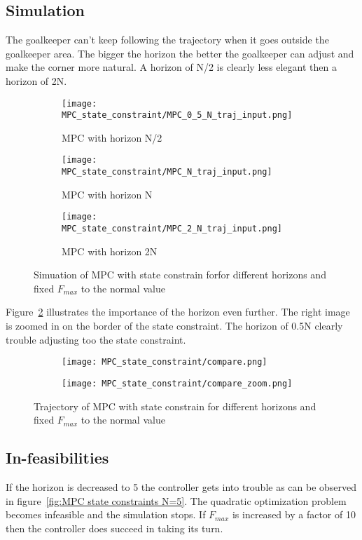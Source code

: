 \subsection{Simulation}
	The goalkeeper can't keep following the trajectory when it goes outside the goalkeeper area. The bigger the horizon the better the goalkeeper can adjust and make the corner more natural. A horizon of N/2 is clearly less elegant then a horizon of 2N. 
	\begin{figure}[H]
		\centering
		\begin{subfigure}[b]{0.45\textwidth}
			\texttt{[image: MPC\_state\_constraint/MPC\_0\_5\_N\_traj\_input.png]}
			\caption{MPC with horizon N/2}
		\end{subfigure}
		\begin{subfigure}[b]{0.45\textwidth}
			\texttt{[image: MPC\_state\_constraint/MPC\_N\_traj\_input.png]}
			\caption{MPC with horizon N}
		\end{subfigure}
		\begin{subfigure}[b]{0.45\textwidth}
			\texttt{[image: MPC\_state\_constraint/MPC\_2\_N\_traj\_input.png]}
			\caption{MPC with horizon 2N}
		\end{subfigure}
		\caption{Simuation of MPC with state constrain forfor different horizons and fixed $F_{max}$ to the normal value}
		\label{fig:MPC state constraint}
	\end{figure}
	Figure~\ref{fig:MPC with state constrain, traject} illustrates the importance of the horizon even further. The right image is zoomed in on the border of the state constraint. The horizon of 0.5N clearly trouble adjusting too the state constraint.
	\begin{figure}[H]
		\centering
		\begin{subfigure}[b]{0.45\textwidth}
			\texttt{[image: MPC\_state\_constraint/compare.png]}
			\caption{}
		\end{subfigure}
		\begin{subfigure}[b]{0.45\textwidth}
			\texttt{[image: MPC\_state\_constraint/compare\_zoom.png]}
			\caption{}
		\end{subfigure}
		\caption{Trajectory of MPC with state constrain for different horizons and fixed $F_{max}$ to the normal value}
		\label{fig:MPC with state constrain, traject}
	\end{figure}

\subsection{In-feasibilities}
	If the horizon is decreased to 5 the controller gets into trouble as can be observed in figure~\ref{fig:MPC state constraints N=5}. The quadratic optimization problem becomes infeasible and the simulation stops. If $F_{max}$  is increased by a factor of 10 then the controller does succeed in taking its turn. 
	
